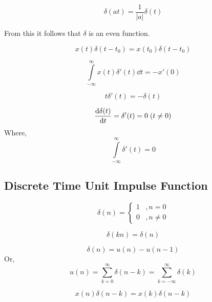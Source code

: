 			\begin{theorem}
				\[\delta(at)=\frac{1}{|a|}\delta(t)\]
			\end{theorem}
			From this it follows that $\delta$ is an even function.
			\begin{theorem}
				\[x(t)\delta(t-t_0)=x(t_0)\delta(t-t_0)\]
			\end{theorem}
			\begin{theorem}
				\[\int\limits_{-\infty}^\infty x(t)\delta'(t)\dd{t}=-x'(0)\]
			\end{theorem}
			\begin{theorem}
				\[t\delta'(t)=-\delta(t)\]
			\end{theorem}
			\begin{theorem}
				\[\dv{\delta(t)}{t}=\delta'(t)=0 \; (t\neq0)\]
				Where,
				\[\int\limits_{-\infty}^\infty\delta'(t)=0\]
			\end{theorem}
			\subsection{Discrete Time Unit Impulse Function}
			\[\delta(n)=\begin{cases}
				1 &, n=0\\
				0 &, n\neq0
			\end{cases}\]
			\begin{theorem}
				\[\delta(kn)=\delta(n)\]
			\end{theorem}
			\begin{theorem}
				\[\delta(n)=u(n)-u(n-1)\]
				Or,
				\[u(n)=\sum\limits_{k=0}^\infty \delta(n-k)=\sum\limits_{k=-\infty}^\infty \delta(k)\]
			\end{theorem}
			\begin{theorem}
				\[x(n)\delta(n-k)=x(k)\delta(n-k)\]
			\end{theorem}
